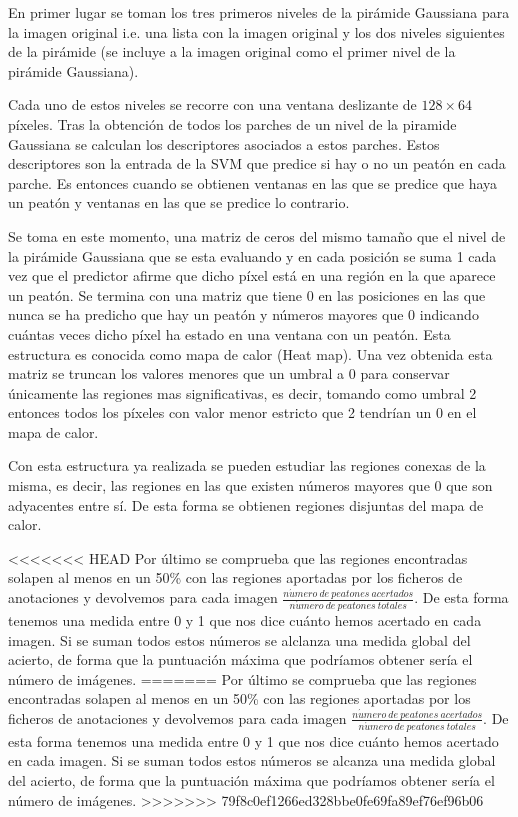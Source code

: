\documentclass[a4paper,12pt]{article}
\begin{document}
En primer lugar se toman los tres primeros niveles de la pirámide Gaussiana para la imagen original i.e. una lista con la imagen original y los dos niveles siguientes de la pirámide (se incluye a la imagen original como el primer nivel de la pirámide Gaussiana).

Cada uno de estos niveles se recorre con una ventana deslizante de $128\times 64$ píxeles. Tras la obtención de todos los parches de un nivel de la piramide Gaussiana se calculan los descriptores asociados a estos parches. Estos descriptores son la entrada de la SVM que predice si hay o no un peatón en cada parche. Es entonces cuando se obtienen ventanas en las que se predice que haya un peatón y ventanas en las que se predice lo contrario.

Se toma en este momento, una matriz de ceros del mismo tamaño que el nivel de la pirámide Gaussiana que se esta evaluando y en cada posición se suma 1 cada vez que el predictor afirme que dicho píxel está en una región en la que aparece un peatón. Se termina con una matriz que tiene 0 en las posiciones en las que nunca se ha predicho que hay un peatón y números mayores que 0 indicando cuántas veces dicho píxel ha estado en una ventana con un peatón. Esta estructura es conocida como mapa de calor (Heat map). Una vez obtenida esta matriz se truncan los valores menores que un umbral a 0 para conservar únicamente las regiones mas significativas, es decir, tomando como umbral 2 entonces todos los píxeles con valor menor estricto que 2 tendrían un 0 en el mapa de calor.

Con esta estructura ya realizada se pueden estudiar las regiones conexas de la misma, es decir, las regiones en las que existen números mayores que 0 que son adyacentes entre sí. De esta forma se obtienen regiones disjuntas del mapa de calor. 

<<<<<<< HEAD
Por último se comprueba que las regiones encontradas solapen al menos en un 50\% con las regiones aportadas por los ficheros de anotaciones y devolvemos para cada imagen $\frac{n\acute{u}mero \ de \ peatones \ acertados}{n\acute{u}mero \ de \ peatones \ totales}$. De esta forma tenemos una medida entre 0 y 1 que nos dice cuánto hemos acertado en cada imagen. Si se suman todos estos números se alclanza una medida global del acierto, de forma que la puntuación máxima que podríamos obtener sería el número de imágenes.
=======
Por último se comprueba que las regiones encontradas solapen al menos en un 50\% con las regiones aportadas por los ficheros de anotaciones y devolvemos para cada imagen $\frac{n\acute{u}mero \ de \ peatones \ acertados}{n\acute{u}mero \ de \ peatones \ totales}$. De esta forma tenemos una medida entre 0 y 1 que nos dice cuánto hemos acertado en cada imagen. Si se suman todos estos números se alcanza una medida global del acierto, de forma que la puntuación máxima que podríamos obtener sería el número de imágenes. 
>>>>>>> 79f8c0ef1266ed328bbe0fe69fa89ef76ef96b06
\end{document}

